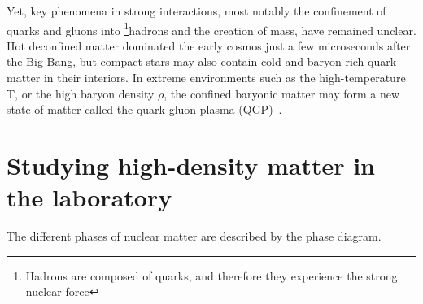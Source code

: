 Yet, key phenomena in strong interactions, most notably the confinement of quarks and gluons into \footnote{Hadrons are composed of quarks, and therefore they experience the strong nuclear force}{hadrons} and the creation of mass, have remained unclear. Hot deconfined matter dominated the early cosmos just a few microseconds after the Big Bang, but compact stars may also contain cold and baryon-rich quark matter in their interiors. In extreme environments such as the high-temperature T, or the high baryon density $\rho$, the confined baryonic matter may form a new state of matter called the quark-gluon plasma (\gls{QGP})~\cite{phase_diagram}.

\section{Studying high-density matter in the laboratory}

The different phases of nuclear matter are described by the phase diagram. 


